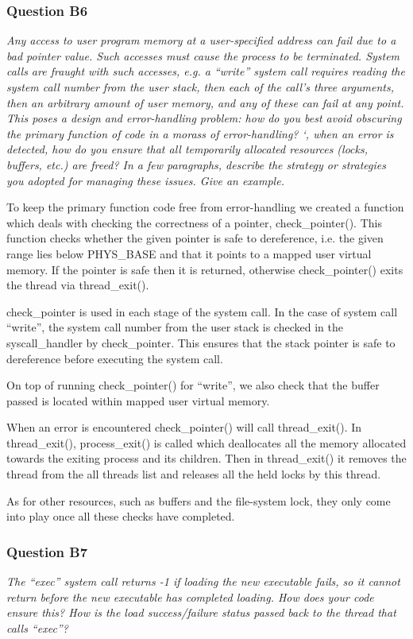 \subsubsection*{Question B6} %
\textit{Any access to user program memory at a user-specified address can fail due to a bad pointer value.  Such accesses must cause the process to be terminated.  System calls are fraught with such accesses, e.g. a ``write'' system call requires reading the system call number from the user stack, then each of the call's three arguments, then an arbitrary amount of user memory, and any of these can fail at any point.  This poses a design and error-handling problem: how do you best avoid obscuring the primary function of code in a morass of error-handling?  `, when an error is detected, how do you ensure that all temporarily allocated resources (locks, buffers, etc.) are freed?  In a few paragraphs, describe the strategy or strategies you adopted for managing these issues.  Give an example.}

To keep the primary function code free from error-handling we created a function which deals with checking the correctness of a pointer, check\_pointer(). This function checks whether the given pointer is safe to dereference, i.e. the given range lies below PHYS\_BASE and that it points to a mapped user virtual memory. If the pointer is safe then it is returned, otherwise check\_pointer() exits the thread via thread\_exit().

check\_pointer is used in each stage of the system call. In the case of system call ``write'', the system call number from the user stack is checked in the syscall\_handler by check\_pointer. This ensures that the stack pointer is safe to dereference before executing the system call.

On top of running check\_pointer() for ``write'', we also check that the buffer passed is located within mapped user virtual memory.

When an error is encountered check\_pointer() will call thread\_exit(). In thread\_exit(), process\_exit() is called which deallocates all the memory allocated towards the exiting process and its children.
Then in thread\_exit() it removes the thread from the all threads list and releases all the held locks by this thread.

As for other resources, such as buffers and the file-system lock, they only come into play once all these checks have completed.

\subsubsection*{Question B7} %
\textit{The ``exec'' system call returns -1 if loading the new executable fails, so it cannot return before the new executable has completed loading.  How does your code ensure this?  How is the load success/failure status passed back to the thread that calls ``exec''?}

